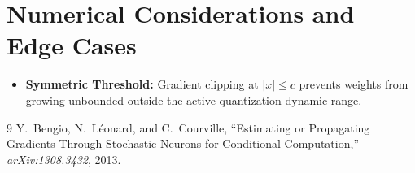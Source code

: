\documentclass[11pt]{article}
\begin{document}
\section{Numerical Considerations and Edge Cases}
\label{sec:numerical}

\begin{itemize}
    \item \textbf{Symmetric Threshold:} Gradient clipping at $|x| \le c$ prevents weights from growing unbounded outside the active quantization dynamic range.
\end{itemize}

\begin{thebibliography}{9}
 Y.~Bengio, N.~L{\'e}onard, and C.~Courville, ``Estimating or Propagating Gradients Through Stochastic Neurons for Conditional Computation,'' \emph{arXiv:1308.3432}, 2013.
\end{thebibliography}
\end{document}
